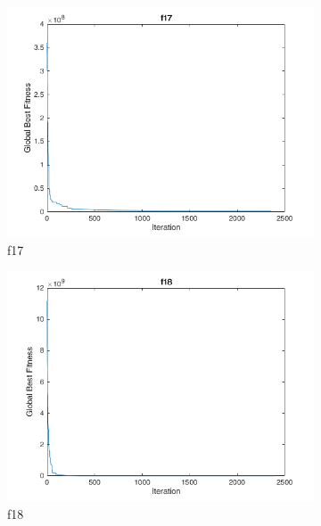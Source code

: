 \begin{figure}
  \centering
  \begin{subfigure}[b]{0.4\textwidth}
    \includegraphics[width=\textwidth]{img/cecrt/f17}
    \caption{f17}
  \end{subfigure}
  \begin{subfigure}[b]{0.4\textwidth}
    \includegraphics[width=\textwidth]{img/cecrt/f18}
    \caption{f18}
  \end{subfigure}
  \begin{subfigure}[b]{0.4\textwidth}

\end{subfigure}
\end{figure}

